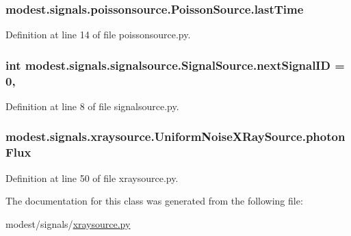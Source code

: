 \subsubsection[{\texorpdfstring{last\+Time}{lastTime}}]{\setlength{\rightskip}{0pt plus 5cm}modest.\+signals.\+poissonsource.\+Poisson\+Source.\+last\+Time\hspace{0.3cm}{\ttfamily [inherited]}}\hypertarget{classmodest_1_1signals_1_1poissonsource_1_1PoissonSource_a34395fc83bd8743a0a5ee69f9392a606}{}\label{classmodest_1_1signals_1_1poissonsource_1_1PoissonSource_a34395fc83bd8743a0a5ee69f9392a606}


Definition at line 14 of file poissonsource.\+py.

\subsubsection[{\texorpdfstring{next\+Signal\+ID}{nextSignalID}}]{\setlength{\rightskip}{0pt plus 5cm}int modest.\+signals.\+signalsource.\+Signal\+Source.\+next\+Signal\+ID = 0\hspace{0.3cm}{\ttfamily [static]}, {\ttfamily [inherited]}}\hypertarget{classmodest_1_1signals_1_1signalsource_1_1SignalSource_a453eafb550b551adbec0903deb63dfce}{}\label{classmodest_1_1signals_1_1signalsource_1_1SignalSource_a453eafb550b551adbec0903deb63dfce}


Definition at line 8 of file signalsource.\+py.

\subsubsection[{\texorpdfstring{photon\+Flux}{photonFlux}}]{\setlength{\rightskip}{0pt plus 5cm}modest.\+signals.\+xraysource.\+Uniform\+Noise\+X\+Ray\+Source.\+photon\+Flux}\hypertarget{classmodest_1_1signals_1_1xraysource_1_1UniformNoiseXRaySource_a9b8049972baf6e0640181b58850a3d20}{}\label{classmodest_1_1signals_1_1xraysource_1_1UniformNoiseXRaySource_a9b8049972baf6e0640181b58850a3d20}


Definition at line 50 of file xraysource.\+py.



The documentation for this class was generated from the following file\+:\begin{DoxyCompactItemize}
\item 
modest/signals/\hyperlink{xraysource_8py}{xraysource.\+py}\end{DoxyCompactItemize}
